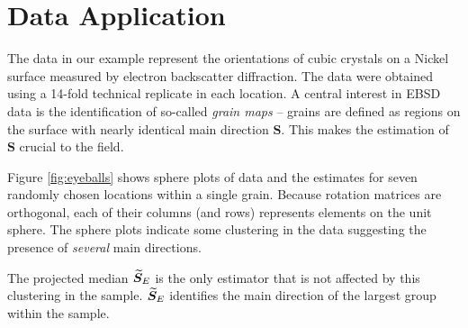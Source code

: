 \section{Data Application}\label{sec:data}

The data in our example represent the orientations of cubic crystals on a Nickel surface measured by electron backscatter diffraction. The data were obtained using a 14-fold technical replicate in each location. 
A central interest in EBSD data is the identification of so-called {\it grain maps} -- grains are defined as regions on the surface with nearly identical main direction $\bm S$. This makes the estimation of $\bm S$ crucial to the field. 


Figure \ref{fig:eyeballs} shows sphere plots of  data and the estimates for seven randomly chosen locations within a single grain.  Because rotation matrices are orthogonal, each of their columns (and rows) represents elements on the unit sphere. The sphere plots indicate some clustering in the data suggesting the presence of \emph{several} main directions. 

The projected median ${\widetilde{\bm S}_E}$ is the only estimator that is not affected by this clustering in the sample. ${\widetilde{\bm S}_E}$ identifies the main direction of the largest group within the sample.


%


